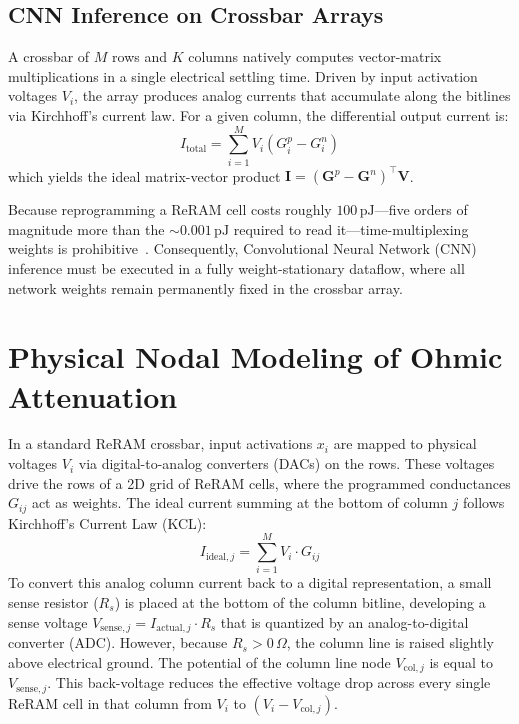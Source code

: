 \documentclass[conference]{IEEEtran}
\begin{document}
\subsection{CNN Inference on Crossbar Arrays}
A crossbar of $M$ rows and $K$ columns natively computes vector-matrix multiplications in a single electrical settling time. Driven by input activation voltages $V_i$, the array produces analog currents that accumulate along the bitlines via Kirchhoff's current law. For a given column, the differential output current is:
$$I_{\text{total}} = \sum_{i=1}^M V_i (G^p_i - G^n_i)$$
which yields the ideal matrix-vector product $\mathbf{I} = (\mathbf{G}^p - \mathbf{G}^n)^\top \mathbf{V}$.

Because reprogramming a ReRAM cell costs roughly $100\,\text{pJ}$---five orders of magnitude more than the ${\sim}0.001\,\text{pJ}$ required to read it---time-multiplexing weights is prohibitive~\cite{perez2021}. Consequently, Convolutional Neural Network (CNN) inference must be executed in a fully weight-stationary dataflow, where all network weights remain permanently fixed in the crossbar array.

\section{Physical Nodal Modeling of Ohmic Attenuation}
In a standard ReRAM crossbar, input activations $x_i$ are mapped to physical voltages $V_i$ via digital-to-analog converters (DACs) on the rows. These voltages drive the rows of a 2D grid of ReRAM cells, where the programmed conductances $G_{ij}$ act as weights. The ideal current summing at the bottom of column $j$ follows Kirchhoff's Current Law (KCL):
\begin{equation}
    I_{\text{ideal}, j} = \sum_{i=1}^{M} V_i \cdot G_{ij}
\end{equation}
To convert this analog column current back to a digital representation, a small sense resistor ($R_s$) is placed at the bottom of the column bitline, developing a sense voltage $V_{\text{sense}, j} = I_{\text{actual}, j} \cdot R_s$ that is quantized by an analog-to-digital converter (ADC). However, because $R_s > 0\,\Omega$, the column line is raised slightly above electrical ground. The potential of the column line node $V_{\text{col}, j}$ is equal to $V_{\text{sense}, j}$. This back-voltage reduces the effective voltage drop across every single ReRAM cell in that column from $V_i$ to $(V_i - V_{\text{col}, j})$.
\end{document}
